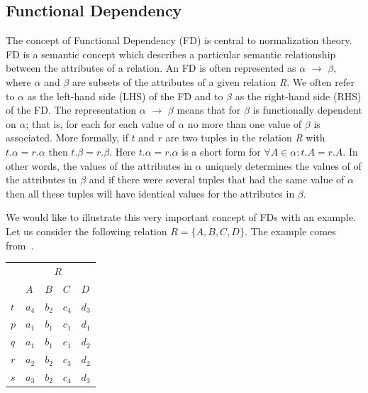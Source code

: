 \subsection{Functional Dependency}
The concept of Functional Dependency (FD) is central to normalization theory. 
FD is a semantic concept which describes a particular semantic relationship 
between the attributes of a relation. An FD is often represented as $\alpha$ $\rightarrow$ $\beta$, 
where $\alpha$ and $\beta$ are subsets of the attributes of a given relation \textit{R}.
We often refer to $\alpha$ as the left-hand side (LHS) of the FD and to $\beta$ as the 
right-hand side (RHS) of the FD.
The representation $\alpha$ $\rightarrow$ $\beta$ means that for $\beta$ is 
functionally dependent on $\alpha$; that is, for each
for each value of $\alpha$ no more than one value of $\beta$ is associated. 
More formally, if $t$ and $r$ are two tuples in the relation \textit{R}
with $t.\alpha = r.\alpha$ then $t.\beta = r.\beta$. Here
$t.\alpha = r.\alpha$ is a short form for 
\begin{math} \forall A \in \alpha : t.A = r.A \end{math}.  
In other words, the values of the attributes  in $\alpha$ uniquely 
determines the values of of the attributes in $\beta$ and 
if there were several tuples that had the same value of $\alpha$ then all these 
tuples will have identical values for the attributes in $\beta$. 

We would like to illustrate this very important concept of FDs with an example. 
Let us consider the following relation $R = \{A, B, C, D\}$. 
The example comes from~\cite[Section 6.1]{bdb2}.

\begin{center}
\begin{tabular}[h]{l|l|l|l|l|}
  \cline{2-5}
  & \multicolumn{4}{|c|}{$R$} \\ \cline{2-5}
  & $A$ & $B$ & $C$ & $D$ \\ \cline{2-5}
  $t$ & $a_4$ & $b_2$ & $c_4$ & $d_3$ \\ 
  $p$ & $a_1$ & $b_1$ & $c_1$ & $d_1$ \\ 
  $q$ & $a_1$ & $b_1$ & $c_1$ & $d_2$ \\ 
  $r$ & $a_2$ & $b_2$ & $c_3$ & $d_2$ \\ 
  $s$ & $a_3$ & $b_2$ & $c_4$ & $d_3$ \\ \cline{2-5}
\end{tabular}
\end{center}

